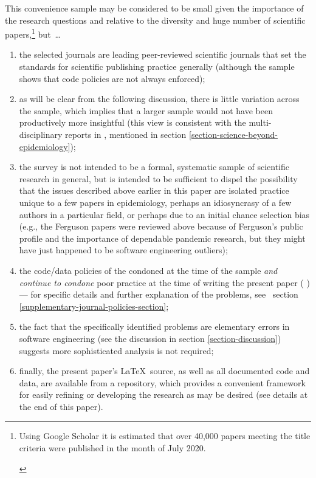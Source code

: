 \begin{change}
This convenience sample may be considered to be small given the importance of the research questions and relative to the diversity and huge number of scientific papers,\footnote{\begin{change}Using Google Scholar it is estimated that over 40,000 papers meeting the title criteria were published in the month of July 2020.\end{change}} but~\ldots

\begin{enumerate}
\item the selected journals are leading peer-reviewed scientific journals that set the standards for scientific publishing practice generally (although the sample shows that code policies are not always enforced); 

\item as will be clear from the following discussion, there is little variation across the sample, which implies that a larger sample would not have been productively more insightful (this view is consistent with the multi-disciplinary reports in \cite{nature-review}, mentioned in section \ref{section-science-beyond-epidemiology}); 

\item the survey is not intended to be a formal, systematic sample of scientific research in general, but is intended to be sufficient to dispel the possibility that the issues described above earlier in this paper are isolated practice unique to a few papers in epidemiology, perhaps an idiosyncrasy of a few authors in a particular field, or perhaps due to an initial chance selection bias (e.g., the Ferguson papers were reviewed above because of Ferguson's public profile and the importance of dependable pandemic research, but they might have just happened to be software engineering outliers);

\item the code/data policies of the  condoned at the time of the sample \emph{and continue to condone\/} poor practice at the time of writing the present paper (\monthname{\month} \the\year) --- for specific details and further explanation of the problems, see \supplement\ section \ref{supplementary-journal-policies-section};

\item
the fact that the specifically identified problems are elementary errors in software engineering (see the discussion in section \ref{section-discussion}) suggests more sophisticated analysis is not required;

\item 
finally, the present paper's \LaTeX\ source, as well as all documented code and data, are available from a repository, which provides a convenient framework for easily refining or developing the research as may be desired (see details at the end of this paper).
\end{enumerate}
\end{change}

